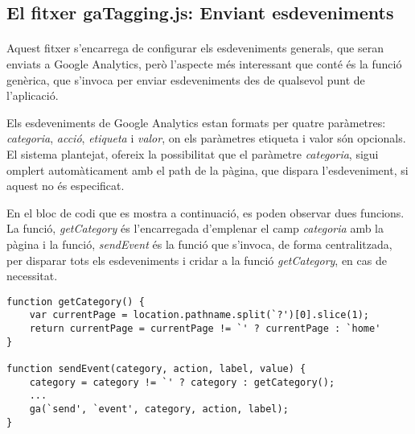 \subsection{El fitxer gaTagging.js: Enviant esdeveniments}

    \paragraph{}
    Aquest fitxer s'encarrega de configurar els esdeveniments generals, que seran en\-vi\-ats a Google Analytics, però l'aspecte més interessant que conté és la funció genèrica, que s'invoca per enviar esdeveniments des de qualsevol punt de l'aplicació.

    Els esdeveniments de Google Analytics estan formats per quatre paràmetres: \emph{categoria}, \emph{acció}, \emph{etiqueta} i \emph{valor}, on els paràmetres etiqueta i valor són opcionals. El sistema plantejat, ofereix la possibilitat que el paràmetre \emph{categoria}, sigui omplert automàticament amb el path de la pàgina, que dispara l'esdeveniment, si aquest no és especificat.

    En el bloc de codi que es mostra a continuació, es poden observar dues funcions. La funció, \emph{getCategory} és l'encarregada d'emplenar el camp \emph{categoria} amb la pàgina i la funció, \emph{sendEvent} és la funció que s'invoca, de forma centralitzada, per disparar tots els esdeveniments i cridar a la funció \emph{getCategory}, en cas de necessitat.

    \begin{lstlisting}[style=rawOwn,caption={Funcions que controlen l'enviament d'esdeveniments a GA}]
function getCategory() {
    var currentPage = location.pathname.split(`?')[0].slice(1);
    return currentPage = currentPage != `' ? currentPage : `home'
}

function sendEvent(category, action, label, value) {
    category = category != `' ? category : getCategory();
    ...
    ga(`send', `event', category, action, label);
}
    \end{lstlisting}
